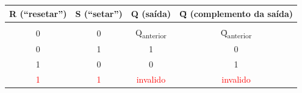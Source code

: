 \documentclass{beamer}
\let\subs\textsubscript
\begin{document}
\begin{frame}
\begin{columns}
\begin{column}[t]{0.5\textwidth}
{            }
        \end{column}    
    \end{columns}
    \begin{center}
        \begin{tabular}{cc|cc}
            R (``resetar'') & S (``setar'') & Q (saída) & \=Q (complemento da saída) \\
            \hline
            & & &\\
            0 & 0 & Q\subs{anterior} & \=Q\subs{anterior}\\
            0 & 1 & 1 & 0 \\
            1 & 0 & 0 & 1 \\
            \textcolor{red}{1} & \textcolor{red}{1} & \textcolor{red}{invalido} & \textcolor{red}{invalido} \\
        \end{tabular}
    \end{center}
\end{frame}
\end{document}
